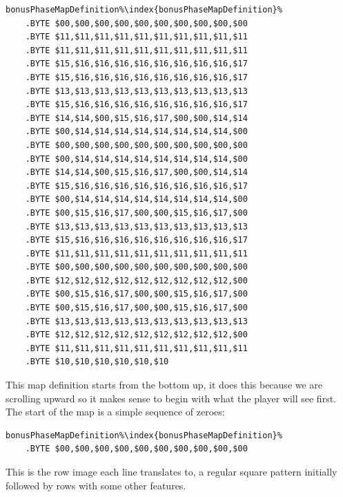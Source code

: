 \begin{lstlisting}[escapechar=\%]
bonusPhaseMapDefinition%\index{bonusPhaseMapDefinition}% 
    .BYTE $00,$00,$00,$00,$00,$00,$00,$00,$00,$00
    .BYTE $11,$11,$11,$11,$11,$11,$11,$11,$11,$11
    .BYTE $11,$11,$11,$11,$11,$11,$11,$11,$11,$11
    .BYTE $15,$16,$16,$16,$16,$16,$16,$16,$16,$17
    .BYTE $15,$16,$16,$16,$16,$16,$16,$16,$16,$17
    .BYTE $13,$13,$13,$13,$13,$13,$13,$13,$13,$13
    .BYTE $15,$16,$16,$16,$16,$16,$16,$16,$16,$17
    .BYTE $14,$14,$00,$15,$16,$17,$00,$00,$14,$14
    .BYTE $00,$14,$14,$14,$14,$14,$14,$14,$14,$00
    .BYTE $00,$00,$00,$00,$00,$00,$00,$00,$00,$00
    .BYTE $00,$14,$14,$14,$14,$14,$14,$14,$14,$00
    .BYTE $14,$14,$00,$15,$16,$17,$00,$00,$14,$14
    .BYTE $15,$16,$16,$16,$16,$16,$16,$16,$16,$17
    .BYTE $00,$14,$14,$14,$14,$14,$14,$14,$14,$00
    .BYTE $00,$15,$16,$17,$00,$00,$15,$16,$17,$00
    .BYTE $13,$13,$13,$13,$13,$13,$13,$13,$13,$13
    .BYTE $15,$16,$16,$16,$16,$16,$16,$16,$16,$17
    .BYTE $11,$11,$11,$11,$11,$11,$11,$11,$11,$11
    .BYTE $00,$00,$00,$00,$00,$00,$00,$00,$00,$00
    .BYTE $12,$12,$12,$12,$12,$12,$12,$12,$12,$00
    .BYTE $00,$15,$16,$17,$00,$00,$15,$16,$17,$00
    .BYTE $00,$15,$16,$17,$00,$00,$15,$16,$17,$00
    .BYTE $13,$13,$13,$13,$13,$13,$13,$13,$13,$13
    .BYTE $12,$12,$12,$12,$12,$12,$12,$12,$12,$00
    .BYTE $11,$11,$11,$11,$11,$11,$11,$11,$11,$11
    .BYTE $10,$10,$10,$10,$10,$10
\end{lstlisting}

This map definition starts from the bottom up, it does this because we
are scrolling upward so it makes sense to begin with what the player
will see first. The start of the map is a simple sequence of zeroes:

\begin{lstlisting}[escapechar=\%]
bonusPhaseMapDefinition%\index{bonusPhaseMapDefinition}% 
    .BYTE $00,$00,$00,$00,$00,$00,$00,$00,$00,$00
\end{lstlisting}

This is the row image each line translates to, a regular square pattern
initially followed by rows with some other features.

